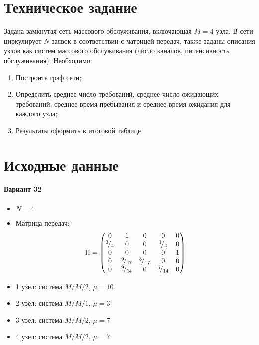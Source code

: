 





\tableofcontents
\listoftables
\listoffigures
\newpage

\section{Техническое задание}

Задана замкнутая сеть массового обслуживания, включающая $M = 4$ узла. В сети циркулирует $N$ заявок в соответствии с матрицей передач, также заданы описания узлов как систем массового обслуживания (число каналов, интенсивность обслуживания). Необходимо:
\begin{enumerate}
	\item Построить граф сети;
	\item Определить среднее число требований, среднее число ожидающих требований, среднее время пребывания и среднее время ожидания для каждого узла;
	\item Результаты оформить в итоговой таблице
\end{enumerate}

\section{Исходные данные}

\paragraph{Вариант 32}

\begin{itemize}
	\item $N = 4$
	\item Матрица передач:
	\begin{displaymath}
		\Pi = \begin{pmatrix}
			0 & 1 & 0 & 0 & 0 \\
			{}^{3}\!/_{4} & 0 & 0 & {}^{1}\!/_{4} & 0 \\
			0 & 0 & 0 & 0 & 1 \\
			0 & {}^{9}\!/_{17} & {}^{8}\!/_{17} & 0 & 0 \\
			0 & {}^{9}\!/_{14} & 0 & {}^{5}\!/_{14} & 0
		\end{pmatrix}
	\end{displaymath}
	\item 1 узел: система $M/M/2$, $\mu = 10$
	\item 2 узел: система $M/M/1$, $\mu = 3$
	\item 3 узел: система $M/M/2$, $\mu = 7$
	\item 4 узел: система $M/M/2$, $\mu = 7$
\end{itemize}

